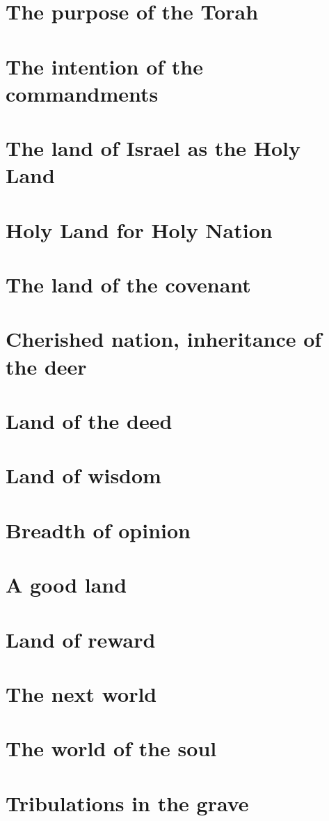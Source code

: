 \documentclass[11pt, a5paper, twoside, chapterprefix, openany]{scrbook}
\begin{document}
\chapter{The purpose of the Torah}
\chapter{The intention of the commandments}
\chapter{The land of Israel as the Holy Land}
\chapter{Holy Land for Holy Nation}
\chapter{The land of the covenant}
\chapter{Cherished nation, inheritance of the deer}
\chapter{Land of the deed}
\chapter{Land of wisdom}
\chapter{Breadth of opinion}
\chapter{A good land}
\chapter{Land of reward}
\chapter{The next world}
\chapter{The world of the soul}
\chapter{Tribulations in the grave}
\end{document}
